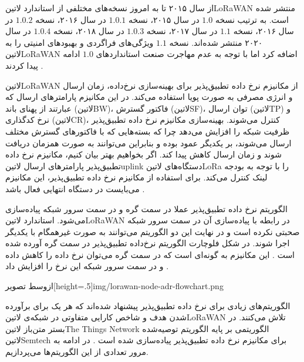 از سال ۲۰۱۵ تا به امروز نسخه‌های مختلفی از استاندارد ‌لاتین{LoRaWAN} منتشر شده است.
به ترتیب نسخه $1.0$ در سال ۲۰۱۵، نسخه $1.0.1$ در سال ۲۰۱۶، نسخه $1.0.2$ در سال ۲۰۱۶،
نسخه $1.1$ در سال ۲۰۱۷، نسخه $1.0.3$ در سال ۲۰۱۸، نسخه $1.0.4$ در سال ۲۰۲۰ منتشر شده‌اند.
نسخه $1.1$ ویژگی‌های فراگردی و بهبودهای امنیتی را به ‌لاتین{LoRaWAN} اضافه کرد اما با توجه به عدم مهاجرت
صنعت استانداردهای $1.0$ ادامه پیدا کردند
.


‌لاتین{LoRaWAN} از مکانیزم نرخ داده تطبیق‌پذیر برای بهینه‌سازی نرخ‌داده، زمان ارسال و انرژی مصرفی به صورت پویا استفاده می‌کند.
در این مکانیزم پارامترهای ارسال که عبارتند از پهنای باند (‌لاتین{BW})، فاکتور گسترش (‌لاتین{SF})،
توان ارسال (‌لاتین{TP}) و نرخ کدگذاری (‌لاتین{CR})، کنترل می‌شوند.
بهینه‌سازی مکانیزم نرخ داده تطبیق‌پذیر ظرفیت شبکه را افزایش می‌دهد چرا که بسته‌هایی که با فاکتورهای گسترش مختلف ارسال می‌شوند،
بر یکدیگر عمود بوده و بنابراین می‌توانند به صورت همزمان دریافت شوند و زمان ارسال کاهش پیدا کند.
اگر بخواهیم بهتر بیان کنیم، مکانیزم نرخ داده تطبیق‌پذیر پارامترهای ارسال ‌لاتین{uplink} دستگاه‌های ‌لاتین{LoRa}
را با توجه به بودجه لینک کنترل می‌کند. برای استفاده از مکانیزم نرخ داده تطبیق‌پذیر، این مکانیزم می‌بایست در دستگاه انتهایی فعال باشد
.

الگوریتم نرخ داده تطبیق‌پذیر عملا در سمت گره و در سمت سرور شبکه پیاده‌سازی می‌شود. استاندارد ‌لاتین{LoRaWAN}
در رابطه با پیاده‌سازی آن در سمت سرور شبکه صحبتی نکرده است و در نهایت این دو الگوریتم می‌توانند به صورت غیرهمگام با یکدیگر
اجرا شوند. در شکل  فلوچارت الگوریتم نرخ‌داده تطبیق‌پذیر
در سمت گره آورده شده است
.
این مکانیزم به گونه‌ای است که در سمت گره می‌توان نرخ داده را کاهش داده و در سمت سرور شبکه این نرخ را افزایش داد
.

‌ازوسط
‌تصویر[height=.5\textwidth]{img/lorawan-node-adr-flowchart.png}

الگوریتم‌های زیادی برای نرخ داده تطبیق‌پذیر پیشنهاد شده‌اند که هر یک برای برآورده شدن هدف و شاخص کارایی متفاوتی در شبکه‌ی ‌لاتین{LoRaWAN}
تلاش می‌کنند.
در بستر متن‌باز ‌لاتین{The Things Network}
الگوریتمی بر پایه الگوریتم توصیه‌شده ‌لاتین{Semtech} برای مکانیزم نرخ داده تطبیق‌پذیر پیاده‌سازی شده است
. در ادامه به مرور تعدادی از این الگوریتم‌ها می‌پردازیم.

